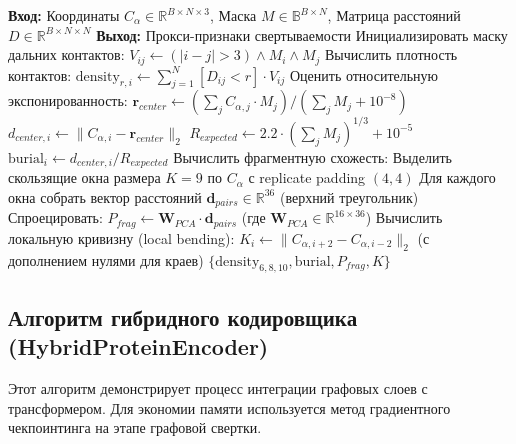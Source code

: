 \documentclass[12pt, a4paper]{article}
\begin{document}
\begin{algorithm}[h]
\caption{Извлечение признаков свертываемости}
\label{alg:foldability}
\begin{algorithmic}[1]
\Statex \textbf{Вход:} Координаты $C_\alpha \in \mathbb{R}^{B \times N \times 3}$, Маска $M \in \mathbb{B}^{B \times N}$, Матрица расстояний $D \in \mathbb{R}^{B \times N \times N}$
\Statex \textbf{Выход:} Прокси-признаки свертываемости
\State Инициализировать маску дальних контактов: $V_{ij} \gets (|i - j| > 3) \land M_i \land M_j$
\State Вычислить плотность контактов:
    \State $\text{density}_{r, i} \gets \sum_{j=1}^N [D_{ij} < r] \cdot V_{ij}$
\EndFor
\State Оценить относительную экспонированность:
\State \quad $\mathbf{r}_{center} \gets \left(\sum_j C_{\alpha, j} \cdot M_j\right) / \left(\sum_j M_j + 10^{-8}\right)$
\State \quad $d_{center, i} \gets \|C_{\alpha, i} - \mathbf{r}_{center}\|_2$
\State \quad $R_{expected} \gets 2.2 \cdot \left(\sum_j M_j\right)^{1/3} + 10^{-5}$
\State \quad $\text{burial}_i \gets d_{center, i} / R_{expected}$
\State Вычислить фрагментную схожесть:
\State \quad Выделить скользящие окна размера $K=9$ по $C_\alpha$ с replicate padding $(4, 4)$
\State \quad Для каждого окна собрать вектор расстояний $\mathbf{d}_{pairs} \in \mathbb{R}^{36}$ (верхний треугольник)
\State \quad Спроецировать: $P_{frag} \gets \mathbf{W}_{PCA} \cdot \mathbf{d}_{pairs}$ (где $\mathbf{W}_{PCA} \in \mathbb{R}^{16 \times 36}$)
\State Вычислить локальную кривизну (local bending):
\State \quad $K_i \gets \|C_{\alpha, i+2} - C_{\alpha, i-2}\|_2$ (с дополнением нулями для краев)
\State \Return $\{\text{density}_{6,8,10}, \text{burial}, P_{frag}, K\}$
\end{algorithmic}
\end{algorithm}

\subsection{Алгоритм гибридного кодировщика (HybridProteinEncoder)}
Этот алгоритм демонстрирует процесс интеграции графовых слоев с трансформером. Для экономии памяти используется метод градиентного чекпоинтинга на этапе графовой свертки.
\end{document}
